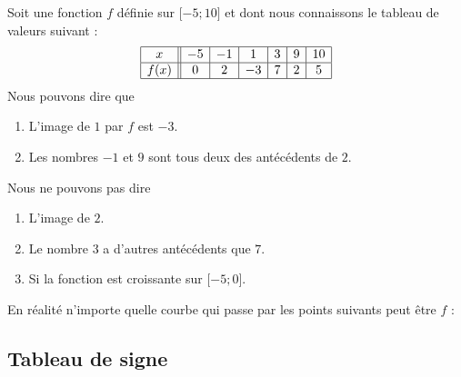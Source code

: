\begin{example}
    Soit une fonction \( f\) définie sur \( \mathopen[ -5 ; 10 \mathclose]\) et dont nous connaissons le tableau de valeurs suivant :
    \begin{equation}
        \begin{array}[h]{|c||c|c|c|c|c|c|}
            \hline
            x&-5&-1&1&3&9&10\\
            \hline
            f(x)&0&2&-3&7&2&5\\
            \hline
        \end{array}
    \end{equation}
    Nous pouvons dire que
    \begin{enumerate}
        \item
            L'image de \( 1\) par \( f\) est \( -3\).
        \item
            Les nombres \( -1\) et \( 9\) sont tous deux des antécédents de \( 2\).
    \end{enumerate}
    Nous ne pouvons pas dire 
    \begin{enumerate}
        \item
            L'image de \( 2\).
        \item
            Le nombre \( 3\) a d'autres antécédents que \( 7\).
        \item
            Si la fonction est croissante sur \( \mathopen[ -5 ;0 \mathclose]\).
    \end{enumerate}


    En réalité n'importe quelle courbe qui passe par les points suivants peut être \( f\) :
    \begin{center}
   
    \end{center}

\end{example}

\subsection{Tableau de signe}

